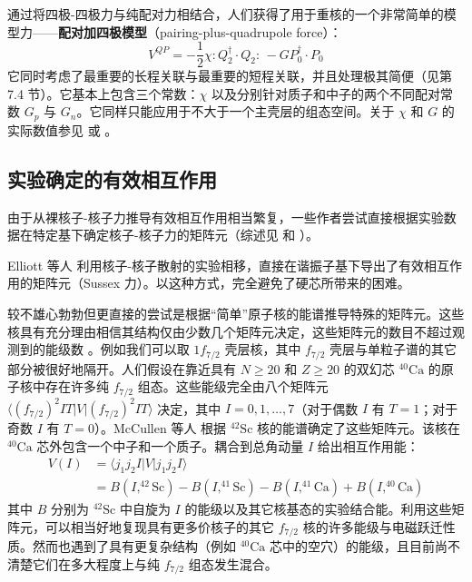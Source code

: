 通过将四极-四极力与纯配对力相结合，人们获得了用于重核的一个非常简单的模型力——\textbf{配对加四极模型}（pairing-plus-quadrupole
force）\cite{KS60,KS63,BK68}：
\begin{equation}
V^{QP}=-\frac{1}{2}\chi:Q^{\dagger}_{2}\cdot Q_{2}:\,-GP^{\dagger}_{0}\cdot P_{0}\label{eq:4.141}
\end{equation}
它同时考虑了最重要的长程关联与最重要的短程关联，并且处理极其简便（见第 7.4 节）。它基本上包含三个常数：$\chi$ 以及分别针对质子和中子的两个不同配对常数
$G_{p}$ 与 $G_{n}$。它同样只能应用于不大于一个主壳层的组态空间。关于 $\chi$ 和 $G$ 的实际数值参见
\cite{KS60} 或 \cite{BK68}。

\subsection{实验确定的有效相互作用}

由于从裸核子-核子力推导有效相互作用相当繁复，一些作者尝试直接根据实验数据在特定基下确定核子-核子力的矩阵元（综述见 \cite{ST76b}
和 \cite{BPO76}）。

Elliott 等人 \cite{EJM68} 利用核子-核子散射的实验相移，直接在谐振子基下导出了有效相互作用的矩阵元（Sussex
力）。以这种方式，完全避免了硬芯所带来的困难。

较不雄心勃勃但更直接的尝试是根据“简单”原子核的能谱推导特殊的矩阵元。这些核具有充分理由相信其结构仅由少数几个矩阵元决定，这些矩阵元的数目不超过观测到的能级数
\cite{Ta62}。例如我们可以取 $1f_{7/2}$ 壳层核，其中 $f_{7/2}$ 壳层与单粒子谱的其它部分被很好地隔开。人们假设在靠近具有
$N\ge20$ 和 $Z\ge20$ 的双幻芯 $^{40}\mathrm{Ca}$ 的原子核中存在许多纯 $f_{7/2}$
组态。这些能级完全由八个矩阵元 $\langle(f_{7/2})^{2}IT|V|(f_{7/2})^{2}IT\rangle$
决定，其中 $I=0,1,\ldots,7$（对于偶数 $I$ 有 $T=1$；对于奇数 $I$ 有 $T=0$）。McCullen
等人 \cite{MBZ64} 根据 $^{42}\mathrm{Sc}$ 核的能谱确定了这些矩阵元。该核在 $^{40}\mathrm{Ca}$
芯外包含一个中子和一个质子。耦合到总角动量 $I$ 给出相互作用能：
\begin{align}
V(I) & =\langle j_{1}j_{2}I|V|j_{1}j_{2}I\rangle\nonumber \\
 & =B(I,^{42}\mathrm{Sc})-B(I,^{41}\mathrm{Sc})-B(I,^{41}\mathrm{Ca})+B(I,^{40}\mathrm{Ca})\label{eq:4.142}
\end{align}
其中 $B$ 分别为 $^{42}\mathrm{Sc}$ 中自旋为 $I$ 的能级以及其它核基态的实验结合能。利用这些矩阵元，可以相当好地复现具有更多价核子的其它
$f_{7/2}$ 核的许多能级与电磁跃迁性质。然而也遇到了具有更复杂结构（例如 $^{40}\mathrm{Ca}$ 芯中的空穴）的能级，且目前尚不清楚它们在多大程度上与纯
$f_{7/2}$ 组态发生混合。

